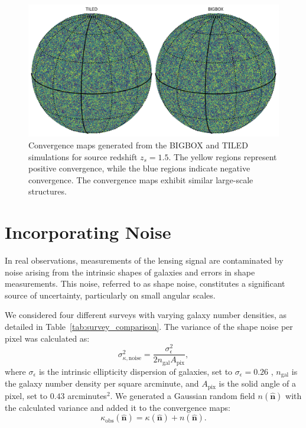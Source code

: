 \begin{figure}
    \centering
    \includegraphics[width=\textwidth]{figures/samplemap.png}
    \caption[Convergence maps generated from the BIGBOX and TILED simulations]{Convergence maps generated from the BIGBOX and TILED simulations for source redshift $z_s = 1.5$. The yellow regions represent positive convergence, while the blue regions indicate negative convergence. The convergence maps exhibit similar large-scale structures.} \label{fig:convergence_maps}
\end{figure}


\section{Incorporating Noise}
In real observations, measurements of the lensing signal are contaminated by noise arising from the intrinsic shapes of galaxies and errors in shape measurements. This noise, referred to as shape noise, constitutes a significant source of uncertainty, particularly on small angular scales.

We considered four different surveys with varying galaxy number densities, as detailed in Table~\ref{tab:survey_comparison}.
The variance of the shape noise per pixel was calculated as:
\begin{equation}
    \sigma_{\kappa, \text{noise}}^2 = \frac{\sigma_{\epsilon}^2}{2 n_{\mathrm{gal}} A_{\mathrm{pix}}},
\end{equation}
where $\sigma_{\epsilon}$ is the intrinsic ellipticity dispersion of galaxies, set to $\sigma_{\epsilon} = 0.26$ \citep{2019A&A...627A..59E}, $n_{\mathrm{gal}}$ is the galaxy number density per square arcminute, and $A_{\mathrm{pix}}$ is the solid angle of a pixel, set to $0.43$ arcminutes$^2$.
We generated a Gaussian random field $n(\hat{\mathbf{n}})$ with the calculated variance and added it to the convergence maps:
\begin{equation}
    \kappa_{\mathrm{obs}}(\hat{\mathbf{n}}) = \kappa(\hat{\mathbf{n}}) + n(\hat{\mathbf{n}}).
\end{equation}

